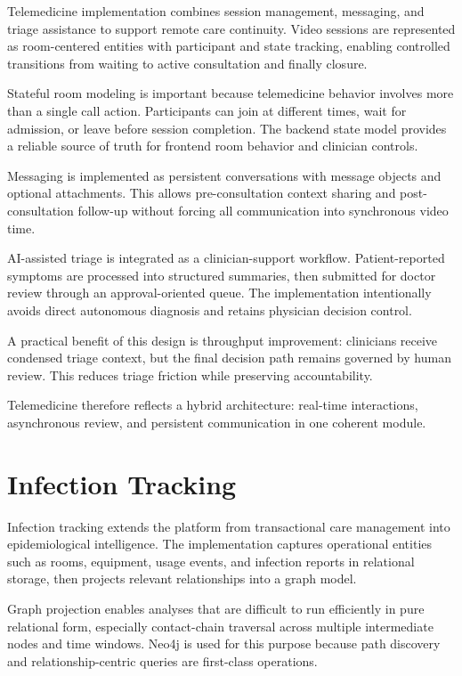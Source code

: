 Telemedicine implementation combines session management, messaging, and triage assistance to support remote care continuity. Video sessions are represented as room-centered entities with participant and state tracking, enabling controlled transitions from waiting to active consultation and finally closure.

Stateful room modeling is important because telemedicine behavior involves more than a single call action. Participants can join at different times, wait for admission, or leave before session completion. The backend state model provides a reliable source of truth for frontend room behavior and clinician controls.

Messaging is implemented as persistent conversations with message objects and optional attachments. This allows pre-consultation context sharing and post-consultation follow-up without forcing all communication into synchronous video time.

AI-assisted triage is integrated as a clinician-support workflow. Patient-reported symptoms are processed into structured summaries, then submitted for doctor review through an approval-oriented queue. The implementation intentionally avoids direct autonomous diagnosis and retains physician decision control.

A practical benefit of this design is throughput improvement: clinicians receive condensed triage context, but the final decision path remains governed by human review. This reduces triage friction while preserving accountability.

Telemedicine therefore reflects a hybrid architecture: real-time interactions, asynchronous review, and persistent communication in one coherent module.

\section{Infection Tracking}\label{59-infection-tracking}

Infection tracking extends the platform from transactional care management into epidemiological intelligence. The implementation captures operational entities such as rooms, equipment, usage events, and infection reports in relational storage, then projects relevant relationships into a graph model.

Graph projection enables analyses that are difficult to run efficiently in pure relational form, especially contact-chain traversal across multiple intermediate nodes and time windows. Neo4j is used for this purpose because path discovery and relationship-centric queries are first-class operations.

